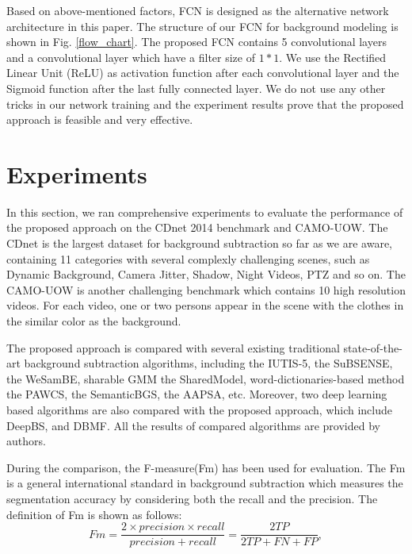 \documentclass[journal]{IEEEtran}
\newcommand{\reffig}[1]{Fig. \ref{#1}}
\begin{document}
Based on above-mentioned factors, FCN is designed as the alternative network architecture in this paper. 
The structure of our FCN for background modeling is shown in \reffig{flow_chart}. 
The proposed FCN contains 5 convolutional layers and a convolutional layer which have a filter size of $1*1$. 
We use the Rectified Linear Unit (ReLU) as activation function after each convolutional layer and the Sigmoid function after the last fully connected layer. 
We do not use any other tricks in our network training and the experiment results prove that the proposed approach is feasible and very effective.


\section{Experiments}
\label{sec5}
In this section, we ran comprehensive experiments to evaluate the performance of the proposed approach on the CDnet 2014 benchmark\cite{CDN2014} and CAMO-UOW. 
The CDnet is the largest dataset for background subtraction so far as we are aware, containing 11 categories with several complexly challenging scenes, such as Dynamic Background, Camera Jitter, Shadow, Night Videos, PTZ and so on. 
The CAMO-UOW is another challenging benchmark which contains 10 high resolution videos. 
For each video, one or two persons appear in the scene with the clothes in the similar color as the background.

The proposed approach is compared with several existing traditional state-of-the-art background subtraction algorithms, including the IUTIS-5\cite{Bianco2017TEC}, the SuBSENSE\cite{St-Charles2015SuBSENSE}, the WeSamBE\cite{Jiang2017WeSamBE}, sharable GMM the SharedModel\cite{Chen2015SharedModel}, word-dictionaries-based method the PAWCS\cite{Charles2015PAWCS}, the SemanticBGS\cite{Braham2017Semantic}, the AAPSA\cite{RAMIREZALONSO2016990}, etc. 
Moreover, two deep learning based algorithms are also compared with the proposed approach, which include DeepBS\cite{Babaee2017deep}, and DBMF\cite{Yang2018DBMF}. 
All the results of compared algorithms are provided by authors.

During the comparison, the F-measure(Fm) has been used for evaluation. 
The Fm is a general international standard in background subtraction which measures the segmentation accuracy by considering both the recall and the precision. 
The definition of Fm is shown as follows:
\begin{equation}
Fm= \frac{2\times precision \times recall}{precision + recall} = \frac{2TP}{2TP+FN+FP},
\end{equation}
% 
% 
%
\end{document}
